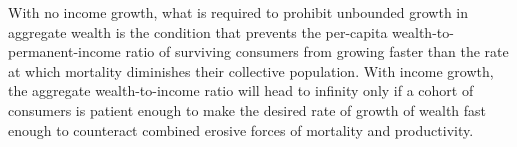\documentclass[\econtexRoot/BufferStockTheory]{subfiles}
\begin{document}
With no income growth, what is required to prohibit unbounded growth in aggregate wealth is the condition that prevents the per-capita wealth-to-permanent-income ratio of surviving consumers from growing faster than the rate at which mortality diminishes their collective population.
With income growth, the aggregate wealth-to-income ratio will head to infinity only if a cohort of consumers is patient enough to make the desired rate of growth of wealth fast enough to counteract combined erosive forces of mortality and productivity.
\end{document}
